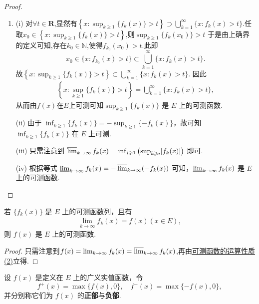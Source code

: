 \documentclass[../../main.tex]{subfiles}
\begin{document}
\begin{proof}
\begin{enumerate}[(1)]
\item (i) 对$\forall t \in \mathbf{R}$,显然有$\left\{x: \sup_{k \geqslant 1}\{f_k(x)\} > t\right\} \supset \bigcup_{k = 1}^{\infty}\{x: f_k(x) > t\}.$任取$x_0\in \left\{x: \sup_{k \geqslant 1}\{f_k(x)\} > t\right\}$,则$ \sup_{k \geqslant 1}\{f_k(x_0)\} > t$
于是由上确界的定义可知,存在$k_0\in \mathbb{N}$,使得$f_{k_0}(x_0)>t$.此即$$x_0\in \{x: f_{k_0}(x) > t\}\subset \bigcup_{k = 1}^{\infty}\{x: f_k(x) > t\}.$$
故$\left\{x: \sup_{k \geqslant 1}\{f_k(x)\} > t\right\} \subset \bigcup_{k = 1}^{\infty}\{x: f_k(x) > t\}.$
因此
\begin{align*}
\left\{x: \sup_{k \geqslant 1}\{f_k(x)\} > t\right\} = \bigcup_{k = 1}^{\infty}\{x: f_k(x) > t\},
\end{align*}
从而由$f(x)$在$E$上可测可知\(\sup_{k \geqslant 1}\{f_k(x)\}\) 是 \(E\) 上的可测函数.

(ii) 由于 \(\inf_{k \geqslant 1}\{f_k(x)\} = -\sup_{k \geqslant 1}\{-f_k(x)\}\)，故可知 \(\inf_{k \geqslant 1}\{f_k(x)\}\) 在 \(E\) 上可测.

(iii) 只需注意到 \(\varlimsup_{k \to \infty} f_k(x) = \inf_{i \geqslant 1}\left(\sup_{k \geqslant i}[f_k(x)]\right)\) 即可.

(iv) 根据等式 \(\varliminf_{k \to \infty} f_k(x) = -\varlimsup_{k \to \infty}(-f_k(x))\) 可知，\(\varliminf_{k \to \infty} f_k(x)\) 是 \(E\) 上的可测函数. 
\end{enumerate}
\end{proof}

\begin{corollary}\label{corollary:可测函数列的极限也可测}
若 \(\{f_k(x)\}\) 是 \(E\) 上的可测函数列，且有
\begin{align*}
\lim_{k \to \infty}f_k(x) = f(x) (x \in E),
\end{align*}
则 \(f(x)\) 是 \(E\) 上的可测函数. 
\end{corollary}
\begin{proof}
只需注意到$f(x)=\lim_{k\to \infty}f_k(x)=\varlimsup_{k\to \infty}f_k(x)$,再由\hyperref[theorem:可测函数的运算性质]{可测函数的运算性质(2)}立得.
\end{proof}

\begin{definition}[函数的正部和负部]
设 \(f(x)\) 是定义在 \(E\) 上的广义实值函数，令
\[
f^+(x) = \max\{f(x),0\}, \quad f^-(x) = \max\{-f(x),0\},
\]
并分别称它们为 \(f(x)\) 的\textbf{正部}与\textbf{负部}.
\end{definition}
\end{document}
